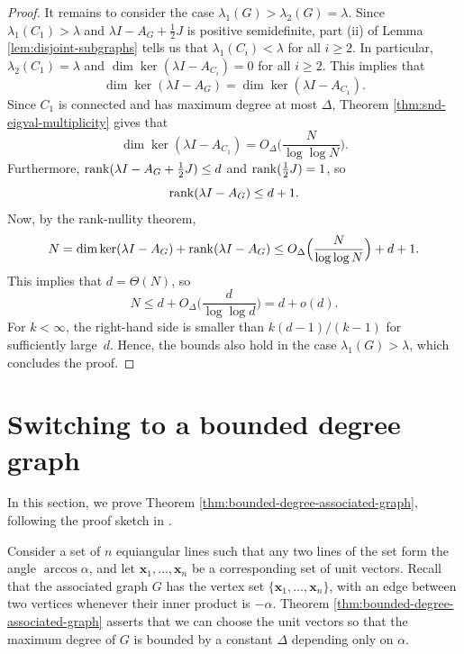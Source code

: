 \begin{proof}
    It remains to consider the case $\lambda_1(G) > \lambda_2(G) = \lambda$.
    Since $\lambda_1(C_1) > \lambda$ and $\lambda I - A_G + \frac{1}{2}J$ is positive semidefinite, part (ii) of Lemma \ref{lem:disjoint-subgraphs} tells us that $\lambda_1(C_i) < \lambda$ for all $i \ge 2$. 
    In particular, $\lambda_2 (C_1) = \lambda$ and $\dim \ker (\lambda I - A_{C_i}) = 0$ for all $i \ge 2$.
    This implies that
    \begin{equation*}
        \dim \ker (\lambda I - A_G) = \dim \ker (\lambda I - A_{C_1}).
    \end{equation*}
    Since $C_1$ is connected and has maximum degree at most $\Delta$, Theorem \ref{thm:snd-eigval-multiplicity} gives that
    \begin{equation*}
        \dim \ker (\lambda I - A_{C_1}) = O_\Delta \Big ( \frac{N}{\log \log N} \Big).
    \end{equation*}
    Furthermore, $\operatorname{rank} ( \lambda I - A_G + \frac{1}{2}J ) \le d$ and $\operatorname{rank} (\frac{1}{2} J) = 1$, so 
    \begin{equation*}
        \operatorname{rank} (\lambda I - A_G) \le d + 1.
    \end{equation*}
    Now, by the rank-nullity theorem, 
    \begin{equation*}
        N = \dim \ker (\lambda I - A_G) + \operatorname{rank} (\lambda I - A_G) \le O_\Delta \Big ( \frac{N}{\log \log N} \Big) + d + 1.
    \end{equation*}
    This implies that $d = \Theta (N)$, so 
    \begin{equation*}
        N \le d + O_\Delta \Big ( \frac{d}{\log \log d} \Big) = d + o(d).
    \end{equation*}
    For $k < \infty$, the right-hand side is smaller than $k (d - 1) / (k - 1)$ for sufficiently \mbox{large $d$}.
    Hence, the bounds also hold in the case $\lambda_1(G) > \lambda$, which concludes the proof.
\end{proof}

\section{Switching to a bounded degree graph}
    \label{section:bounded-degree-graph}

In this section, we prove Theorem \ref{thm:bounded-degree-associated-graph}, following the proof sketch in \cite{equiangularexpository}.

Consider a set of $n$ equiangular lines such that any two lines of the set form the angle $\arccos \alpha$, and let $\bm{x}_1, \dots, \bm{x}_n$ be a corresponding set of unit vectors. 
Recall that the associated graph $G$ has the vertex set $\{\bm{x}_1, \dots, \bm{x}_n\}$, with an edge between two vertices whenever their inner product is $-\alpha$.
Theorem \ref{thm:bounded-degree-associated-graph} asserts that we can choose the unit vectors so that the maximum degree of $G$ is bounded by a constant $\Delta$ depending only on $\alpha$.

